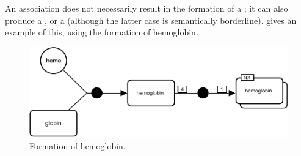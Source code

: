 An association does not necessarily result in the formation of a ; it can also produce a , or a  (although the latter case is semantically borderline).   gives an example of this, using the formation of hemoglobin.

\begin{figure}[H]
  \centering
  \includegraphics[scale = 0.8]{examples/association-multimerisation}
  \caption{Formation of hemoglobin.}
  \label{fig:assoc-multi}
\end{figure}

